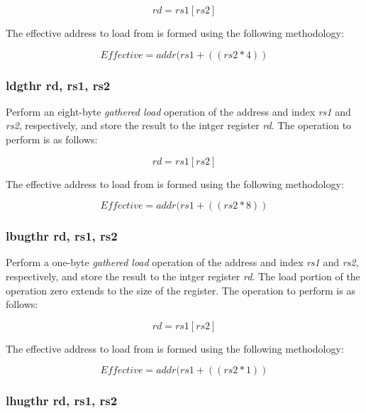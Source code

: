 \documentclass{article}
\begin{document}
\begin{equation}
rd = rs1[rs2]
\end{equation}

The effective address to load
from is formed using the following methodology:

\begin{equation}
Effective = addr(rs1 + ((rs2 * 4))
\end{equation}

\subsubsection{ldgthr rd, rs1, rs2}

Perform an eight-byte \emph{gathered load} operation of the address and
index \emph{rs1} and \emph{rs2}, respectively, and store the result
to the intger register \emph{rd}.  The operation to perform is as follows:

\begin{equation}
rd = rs1[rs2]
\end{equation}

The effective address to load
from is formed using the following methodology:

\begin{equation}
Effective = addr(rs1 + ((rs2 * 8))
\end{equation}

\subsubsection{lbugthr rd, rs1, rs2}

Perform a one-byte \emph{gathered load} operation of the address and
index \emph{rs1} and \emph{rs2}, respectively, and store the result
to the intger register \emph{rd}.  The load portion of the operation
zero extends to the size of the register.
The operation to perform is as follows:

\begin{equation}
rd = rs1[rs2]
\end{equation}

The effective address to load
from is formed using the following methodology:

\begin{equation}
Effective = addr(rs1 + ((rs2 * 1))
\end{equation}

\subsubsection{lhugthr rd, rs1, rs2}
\end{document}
